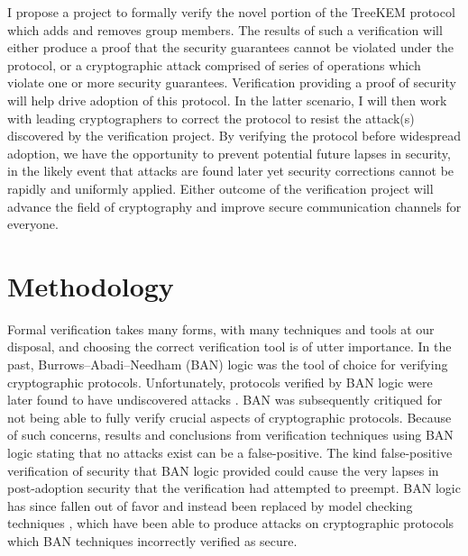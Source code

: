 \documentclass[12pt,twocolumn]{article}
\begin{document}
	I propose a project to formally verify the novel portion of the TreeKEM protocol which adds and removes group members.
	The results of such a verification will either produce a proof that the security guarantees cannot be violated under the protocol, or a cryptographic attack comprised of series of operations which violate one or more security guarantees.
	Verification providing a proof of security will help drive adoption of this protocol.
	In the latter scenario, I will then work with leading cryptographers to correct the protocol to resist the attack(s) discovered by the verification project.
	By verifying the protocol before widespread adoption, we have the opportunity to prevent potential future lapses in security, in the likely event that attacks are found later yet security corrections cannot be rapidly and uniformly applied.
	Either outcome of the verification project will advance the field of cryptography and improve secure communication channels for everyone.
	
	
	\section*{Methodology}
	
	Formal verification takes many forms, with many techniques and tools at our disposal, and choosing the correct verification tool is of utter importance.
	In the past, Burrows–Abadi–Needham (BAN) \cite{burrows1989logic} logic was the tool of choice for verifying cryptographic protocols.
	Unfortunately, protocols verified by BAN logic were later found to have undiscovered attacks \cite{10.5555/188307.188350}.
	BAN was subsequently critiqued for not being able to fully verify crucial aspects of cryptographic protocols.
	Because of such concerns, results and conclusions from verification techniques using BAN logic stating that no attacks exist can be a false-positive.
	The kind false-positive verification of security that BAN logic provided could cause the very lapses in post-adoption security that the verification had attempted to preempt.
	BAN logic has since fallen out of favor and instead been replaced by model checking techniques \cite{marrero1997model}, which have been able to produce attacks on cryptographic protocols which BAN techniques incorrectly verified as secure.
	
\end{document}
